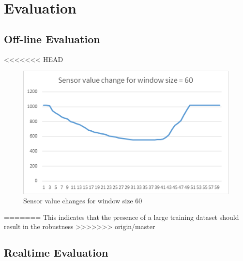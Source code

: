\section{Evaluation}

\subsection{Off-line Evaluation}
<<<<<<< HEAD

\begin{figure}[h]
\includegraphics[width=.45\textwidth]{window_60.png}
\caption{Sensor value changes for window size 60}
\label{fig:window_60}
\end{figure}


=======
This indicates that the presence of a large training dataset should result in the robustness 
>>>>>>> origin/master
\subsection{Realtime Evaluation}
